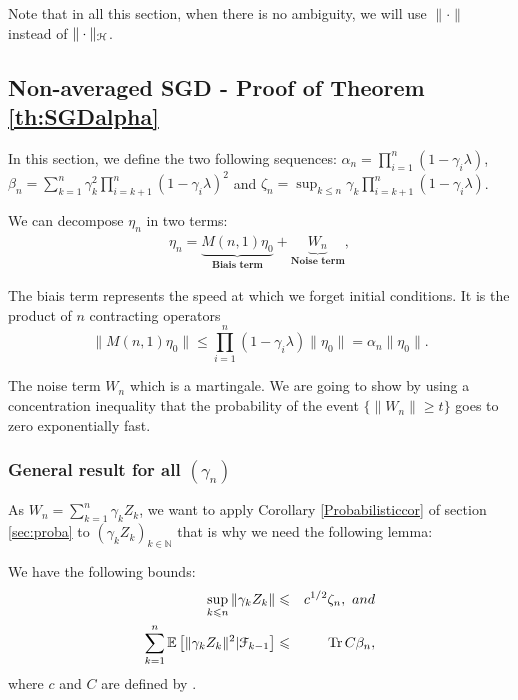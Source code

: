 Note that in all this section, when there is no ambiguity, we will use $\|\cdot\|$ instead of $\|\cdot\|_{\mathcal H}$. 

\subsection{Non-averaged SGD - Proof of Theorem \ref{th:SGDalpha}}
\label{ap:SGDalpha}

In this section, we define the two following sequences: $\displaystyle \alpha_n = \prod_{i=1}^n ( 1-\gamma_i \lambda)$, \\ $\displaystyle \beta_n = \sum_{k=1}^n \gamma_k^2 \prod_{i=k+1}^n (1-\gamma_i \lambda)^2$ and $\zeta_n = \displaystyle \sup_{ k \leqslant n}\gamma_k \prod_{i=k+1}^n \left(1-\gamma_i\lambda\right)$.   

We can decompose $\eta_n$ in two terms: 
\begin{eqnarray}
 \eta_n = \underbrace{M(n,1) \eta_0}_{\textbf{Biais term}} + \underbrace{W_n}_{\textbf{Noise term}},
\end{eqnarray}
\BIT
\item The biais term represents the speed at which we forget initial conditions. It is the product of $n$ contracting operators $$\|  M(n,1)  \eta_0 \| \leqslant \prod_{i=1}^n ( 1-\gamma_i \lambda) \| \eta_0\| = \alpha_n \|\eta_0\|.$$
\item The noise term $W_n$ which is a martingale. We are going to show by using a concentration inequality that the probability of the event $\{ \| W_n \| \geq t\}$ goes to zero exponentially fast.
\EIT

\subsubsection{General result for all \texorpdfstring{$(\gamma_n)$}{gamma}}

As $W_n = \sum_{k=1}^n \gamma_k Z_k$, we want to apply Corollary \ref{Probabilisticcor} of section \ref{sec:proba} to $(\gamma_kZ_k)_{k \in \mathbb{N}}$ that is why we need the following lemma:

\begin{lemma}
\label{le:boundsalpha}
We have the following bounds: 
\begin{eqnarray}
\sup_{ k \leqslant n} \| \gamma_k Z_k \| &\leqslant& c^{1/2} \zeta_n, \ and \\
\sum_{k=1}^n \mathbb{E}\left[ \|\gamma_k Z_k\|^2 | \mathcal{F}_{k-1} \right] &\leqslant& \operatorname{Tr} C \beta_n,
\end{eqnarray}
where $c$ and $C$ are defined by .
\end{lemma}

